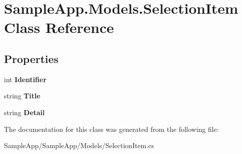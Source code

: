 \hypertarget{class_sample_app_1_1_models_1_1_selection_item}{}\section{Sample\+App.\+Models.\+Selection\+Item Class Reference}
\label{class_sample_app_1_1_models_1_1_selection_item}
\subsection*{Properties}
\begin{DoxyCompactItemize}
\item 
\mbox{\label{class_sample_app_1_1_models_1_1_selection_item_ab242d21d0026fc4cb154c6335fd9fc6c}} 
int {\bfseries Identifier}
\item 
\mbox{\label{class_sample_app_1_1_models_1_1_selection_item_a2febeb5d79be0b571d7532137012dbbd}} 
string {\bfseries Title}
\item 
\mbox{\label{class_sample_app_1_1_models_1_1_selection_item_aeb9a3f568326bb3f8b6f837012a7cc53}} 
string {\bfseries Detail}
\end{DoxyCompactItemize}


The documentation for this class was generated from the following file\+:\begin{DoxyCompactItemize}
\item 
Sample\+App/\+Sample\+App/\+Models/Selection\+Item.\+cs\end{DoxyCompactItemize}
